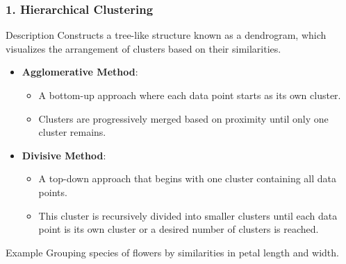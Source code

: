 \documentclass{beamer}
\begin{document}
\begin{frame}[fragile]
    \frametitle{1. Hierarchical Clustering}
    \begin{block}{Description}
        Constructs a tree-like structure known as a dendrogram, which visualizes the arrangement of clusters based on their similarities.
    \end{block}

    \begin{itemize}
        \item \textbf{Agglomerative Method}: 
            \begin{itemize}
                \item A bottom-up approach where each data point starts as its own cluster.
                \item Clusters are progressively merged based on proximity until only one cluster remains.
            \end{itemize}
        
        \item \textbf{Divisive Method}: 
            \begin{itemize}
                \item A top-down approach that begins with one cluster containing all data points.
                \item This cluster is recursively divided into smaller clusters until each data point is its own cluster or a desired number of clusters is reached.
            \end{itemize}
    \end{itemize}

    \begin{block}{Example}
        Grouping species of flowers by similarities in petal length and width.
    \end{block}
\end{frame}
\end{document}
